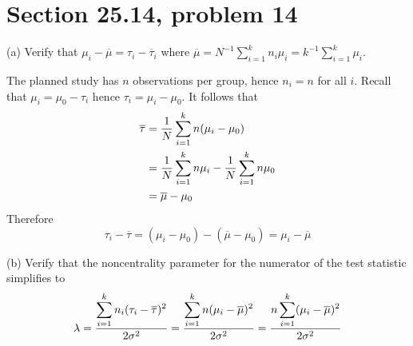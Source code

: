 
\section{Section 25.14, problem 14}
(a) Verify that $\mu_i-\overline{\mu}=\tau_i-\overline{\tau}_i$
where $\overline{\mu}=N^{-1}\sum_{i=1}^kn_i\mu_i
=k^{-1}\sum_{i=1}^k\mu_i$.

\bigskip
\noindent
The planned study has $n$ observations
per group, hence $n_i=n$ for all $i$.
Recall that $\mu_i=\mu_0-\tau_i$ hence $\tau_i=\mu_i-\mu_0$.
It follows that
\begin{align*}
\overline{\tau}&={1\over N}\sum_{i=1}^kn(\mu_i-\mu_0)\\
&={1\over N}\sum_{i=1}^kn\mu_i-{1\over N}\sum_{i=1}^kn\mu_0\\
&=\overline{\mu}-\mu_0
\end{align*}
Therefore
\[
\tau_i-\overline{\tau}=(\mu_i-\mu_0)-(\overline{\mu}-\mu_0)
=\mu_i-\overline{\mu}
\]

\bigskip
\noindent
(b) Verify that the noncentrality parameter for the numerator of the
test statistic simplifies to
\[
\lambda
=
{\displaystyle\sum_{i=1}^kn_i(\tau_i-\overline{\tau})^2\over2\sigma^2}
=
{\displaystyle\sum_{i=1}^kn(\mu_i-\overline{\mu})^2\over2\sigma^2}
=
{\displaystyle n\sum_{i=1}^k(\mu_i-\overline{\mu})^2\over2\sigma^2}
\]

